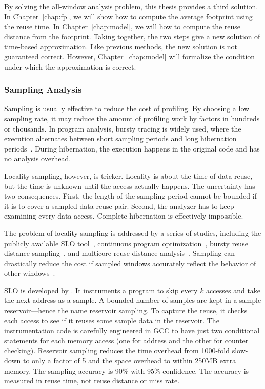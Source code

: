 By solving the all-window analysis problem, this thesis provides a
third solution.  In Chapter~\ref{chap:fp}, we will show how to
compute the average footprint using the reuse time.  In
Chapter~\ref{chap:model}, we will how to compute the reuse distance
from the footprint.  Taking together, the two steps give a new
solution of time-based approximation.  Like previous methods, the new
solution is not guaranteed correct.  However, Chapter~\ref{chap:model}
will formalize the condition under which the approximation is correct.

\subsubsection{Sampling Analysis}
Sampling is usually effective to reduce the cost of profiling.  By
choosing a low sampling rate, it may reduce the amount of profiling
work by factors in hundreds or thousands.  
In program analysis, bursty
tracing is widely used, where the execution alternates between short
sampling periods and long hibernation
periods~\citep{ArnoldR:PLDI01,HirzelC:FDDO01,ChilimbiH:PLDI02}.  During
hibernation, the execution happens in the original code and has no
analysis overhead.

Locality sampling, however, is tricker.  Locality is about the time of
data reuse, but the time is unknown until the access actually happens.
The uncertainty has two consequences.  First, the length of the
sampling period cannot be bounded if it is to cover a sampled data
reuse pair.  Second, the analyzer has to keep examining every data
access.  Complete hibernation is effectively impossible.

The problem of locality sampling is addressed by a series of studies, including the
publicly available SLO tool~\citep{BeylsD:HPCC06}, continuous program
optimization~\citep{Cascaval+:PACT05}, bursty reuse distance
sampling~\citep{ZhongC:ISMM08}, and multicore reuse distance
analysis~\citep{Schuff+:PACT10}.
Sampling can drastically reduce the cost if sampled windows 
accurately reflect the behavior of other
windows~\citep{BergH:SIGMETRICS05,EklovH:ISPASS10,Eklov+:HiPEAC11}. 

SLO is developed by \citet{BeylsD:HPCC06}.
It instruments a program to skip every $k$ accesses and take the next
address as a sample.  A bounded number of samples are kept in a sample
reservoir---hence the name reservoir sampling. To capture the reuse,
it checks each access to see if it reuses some sample data in the
reservoir.  The instrumentation code is carefully engineered in GCC to
have just two conditional statements for each memory access (one for
address and the other for counter checking).  Reservoir sampling
reduces the time overhead from 1000-fold slow-down to only a factor of
5 and the space overhead to within 250MB extra memory.  The sampling
accuracy is 90\% with 95\% confidence.  The accuracy is measured in
reuse time, not reuse distance or miss rate. 

